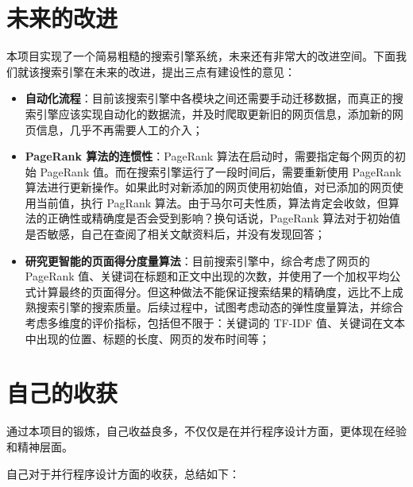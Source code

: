 \documentclass{ctexart}
\begin{document}
    \section{未来的改进}\label{sec:improvement}

    本项目实现了一个简易粗糙的搜索引擎系统，未来还有非常大的改进空间。下面我们就该搜索引擎在未来的改进，提出三点有建设性的意见：

    \begin{itemize}
        \item \textbf{自动化流程}：目前该搜索引擎中各模块之间还需要手动迁移数据，而真正的搜索引擎应该实现自动化的数据流，并及时爬取更新旧的网页信息，添加新的网页信息，几乎不再需要人工的介入；
        \item \textbf{PageRank 算法的连惯性}：PageRank 算法在启动时，需要指定每个网页的初始 PageRank 值。而在搜索引擎运行了一段时间后，需要重新使用 PageRank 算法进行更新操作。如果此时对新添加的网页使用初始值，对已添加的网页使用当前值，执行 PagRank 算法。由于马尔可夫性质，算法肯定会收敛，但算法的正确性或精确度是否会受到影响？换句话说，PageRank 算法对于初始值是否敏感，自己在查阅了相关文献资料后，并没有发现回答；
        \item \textbf{研究更智能的页面得分度量算法}：目前搜索引擎中，综合考虑了网页的 PageRank 值、关键词在标题和正文中出现的次数，并使用了一个加权平均公式计算最终的页面得分。但这种做法不能保证搜索结果的精确度，远比不上成熟搜索引擎的搜索质量。后续过程中，试图考虑动态的弹性度量算法，并综合考虑多维度的评价指标，包括但不限于：关键词的 TF-IDF 值、关键词在文本中出现的位置、标题的长度、网页的发布时间等；
    \end{itemize}


    \section{自己的收获}\label{sec:achievement}

    通过本项目的锻炼，自己收益良多，不仅仅是在并行程序设计方面，更体现在经验和精神层面。

    自己对于并行程序设计方面的收获，总结如下：
\end{document}
